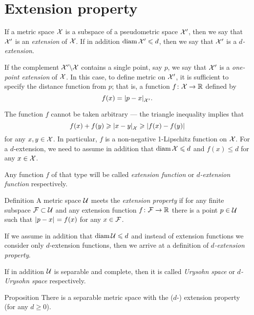 \section{Extension property}

If a metric space $\mathcal{X}$ is a subspace of a pseudometric space $\mathcal{X}'$, then we say that $\mathcal{X}'$ is an \emph{extension} of $\mathcal{X}$.
If in addition $\operatorname{\rm diam}\nolimits\mathcal{X}'\leqslant d$, then we say that $\mathcal{X}'$ is a {}\emph{$d$-extension}.

If the complement $\mathcal{X}'\backslash \mathcal{X}$ contains a single point, say $p$, we say that $\mathcal{X}'$ is a \emph{one-point extension} of $\mathcal{X}$.
In this case, to define metric on $\mathcal{X}'$, it is sufficient to specify the distance function from $p$; that is, a function $f\colon\mathcal{X}\to\mathbb{R}$ defined by 
\[f(x)=\dist{p}{x}{\spc{X}'}.\]

The function $f$ cannot be taken arbitrary --- the triangle inequality implies that 
\[f(x)+f(y)\ge \dist{x}{y}{\spc{X}}\ge |f(x)-f(y)|\]
for any $x,y\in \mathcal{X}$.
In particular, $f$ is a non-negative 1-Lipschitz function on $\mathcal{X}$.
For a $d$-extension, we need to assume in addition that $\diam\spc{X}\z\le d$ and $f(x)\le d$ for any $x\in \mathcal{X}$.

Any function $f$ of that type will be called \emph{extension function}\label{page:extension function} or {}\emph{$d$-extension function} respectively.

\begin{thm}{Definition}\label{def:finite+1}
A metric space $\mathcal{U}$ meets the \emph{extension property}  if for any finite subspace $\mathcal{F}\subset\mathcal{U}$ and any extension function $f\colon\mathcal{F}\to\mathbb{R}$ there is a point $p\in \mathcal{U}$ such that $\dist{p}{x}{}=f(x)$ for any $x\in \mathcal{F}$.

If we assume in addition that $\operatorname{\rm diam}\nolimits \mathcal{U}\leqslant d$ and instead of extension functions we consider only $d$-extension functions, then we arrive at a definition of {}\emph{$d$-extension property}.

If in addition $\mathcal{U}$ is separable and complete, then it is called \emph{Urysohn space} or {}\emph{$d$-Urysohn space} respectively.
\end{thm}


\begin{thm}{Proposition}\label{prop:univeral-separable}
There is a separable metric space with the ($d$-) extension property (for any $d\ge 0$).
\end{thm}

